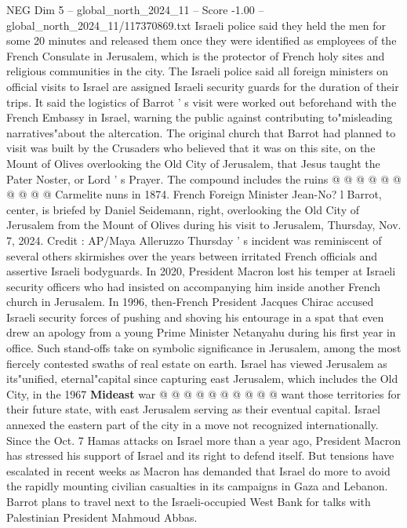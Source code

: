 \begin{textsample}{NEG Dim 5 – global\_north\_2024\_11 – Score -1.00 – global\_north\_2024\_11/117370869.txt}
Israeli police said they held the men for some 20 minutes and released them once they were identified as employees of the French Consulate in Jerusalem, which is the protector of French holy sites and religious communities in the city.
The Israeli police said all foreign ministers on official visits to Israel are assigned Israeli security guards for the duration of their trips.
It said the logistics of Barrot ' s visit were worked out beforehand with the French Embassy in Israel, warning the public against contributing to"misleading narratives"about the altercation.
The original church that Barrot had planned to visit was built by the Crusaders who believed that it was on this site, on the Mount of Olives overlooking the Old City of Jerusalem, that Jesus taught the Pater Noster, or Lord ' s Prayer.
The compound includes the ruins @ @ @ @ @ @ @ @ @ @ Carmelite nuns in 1874.
French Foreign Minister Jean-No? l Barrot, center, is briefed by Daniel Seidemann, right, overlooking the Old City of Jerusalem from the Mount of Olives during his visit to Jerusalem, Thursday, Nov. 7, 2024.
Credit : AP/Maya Alleruzzo Thursday ' s incident was reminiscent of several others skirmishes over the years between irritated French officials and assertive Israeli bodyguards.
In 2020, President Macron lost his temper at Israeli security officers who had insisted on accompanying him inside another French church in Jerusalem.
In 1996, then-French President Jacques Chirac accused Israeli security forces of pushing and shoving his entourage in a spat that even drew an apology from a young Prime Minister Netanyahu during his first year in office.
Such stand-offs take on symbolic significance in Jerusalem, among the most fiercely contested swaths of real estate on earth.
Israel has viewed Jerusalem as its"unified, eternal"capital since capturing east Jerusalem, which includes the Old City, in the 1967 \textbf{Mideast} war @ @ @ @ @ @ @ @ @ @ want those territories for their future state, with east Jerusalem serving as their eventual capital.
Israel annexed the eastern part of the city in a move not recognized internationally.
Since the Oct. 7 Hamas attacks on Israel more than a year ago, President Macron has stressed his support of Israel and its right to defend itself.
But tensions have escalated in recent weeks as Macron has demanded that Israel do more to avoid the rapidly mounting civilian casualties in its campaigns in Gaza and Lebanon.
Barrot plans to travel next to the Israeli-occupied West Bank for talks with Palestinian President Mahmoud Abbas.

\end{textsample}
